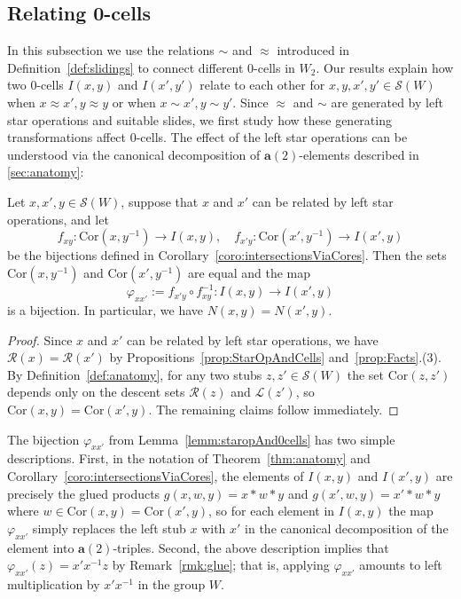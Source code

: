 \documentclass[ALCO,Unicode,published]{cedram}
\newcommand{\call}{\mathcal{L}}
\newcommand{\calr}{\mathcal{R}}
\newcommand{\la}{\mathbf{a}}
\newcommand{\sw}{\mathcal{S}(W)}
\newcommand{\cores}{\mathrm{Cor}}
\newcommand{\ra}{\rightarrow}
\newcommand{\inverse}{^{-1}}
\begin{document}
\subsection{Relating 0-cells}
\label{sec:relating0cells}
In this subsection we use  the relations $\sim$ and $\approx$ introduced in Definition~\ref{def:slidings} to
connect different 0-cells in $W_2$. Our results explain how two 0-cells $I(x,y)$ and $I(x',y')$
relate to each other for $x,y,x',y'\in \sw$ when $x\approx x', y\approx y$ or when $x\sim x',y\sim
y'$. Since $\approx$ and $\sim$ are generated by left star operations and suitable slides, we first
study how these generating transformations affect 0-cells. The effect of the left star operations
can be understood via the canonical decomposition of $\la(2)$-elements described in
\autoref{sec:anatomy}:

\begin{lemma}
    \label{lemm:staropAnd0cells}
    Let $x,x',y\in \sw$, suppose that $x$ and $x'$ can be related by left star operations, and let 
\[
f_{xy}: \cores(x,y\inverse)\ra I(x,y), \quad 
f_{x'y}: \cores(x',y\inverse)\ra I(x',y)   
\]
   be the bijections defined in Corollary~\ref{coro:intersectionsViaCores}.  Then the sets $\cores(x,y\inverse)$ and
   $\cores(x',y\inverse)$ are equal and the map 
   \[
       \varphi_{xx'}:=f_{x'y}\circ f_{xy}\inverse: I(x,y)\ra I(x',y)
\]
is a bijection. In particular, we have $N(x,y)=N(x',y)$. 
\end{lemma}
\begin{proof} 
    Since $x$ and $x'$ can be related by left star operations, we have $\calr(x)=\calr(x')$ by
    Propositions~\ref{prop:StarOpAndCells} and~\ref{prop:Facts}.(3). By Definition~\ref{def:anatomy}, for any
    two stubs  $z,z'\in\sw$ the set $\cores(z,z')$ depends only on the descent sets $\calr(z)$ and
    $\call(z')$, so $\cores(x,y)=\cores(x',y)$. The remaining claims follow immediately.
\end{proof}

\begin{remark}
    \label{rmk:swap}
    The bijection $\varphi_{xx'}$ from Lemma~\ref{lemm:staropAnd0cells} has two simple descriptions.
    First, in the notation of Theorem~\ref{thm:anatomy} and Corollary~\ref{coro:intersectionsViaCores}, the elements
    of $I(x,y)$ and $I(x',y)$ are precisely the glued products $g(x,w,y)=x*w*y$ and
    $g(x',w,y)=x'*w*y$ where $w\in\cores(x,y)=\cores(x',y)$, so for each element in $I(x,y)$ the map
    $\varphi_{xx'}$ simply replaces the left stub $x$ with $x'$ in the canonical decomposition of
    the element into $\la(2)$-triples. Second, the above description implies that
    $\varphi_{xx'}(z)=x'x\inverse z$ by Remark~\ref{rmk:glue}; that is, applying $\varphi_{xx'}$ amounts
    to left multiplication by $x'x\inverse$ in the group $W$. 
\end{remark}
\end{document}
